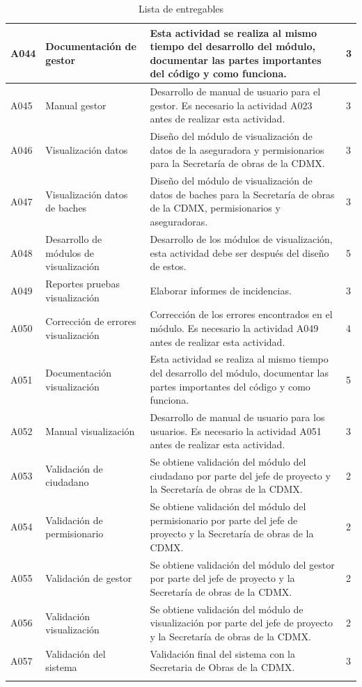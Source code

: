 \documentclass[12pt,twoside]{article}
\begin{document}
\begin{longtable}{|l|m{3cm}|m{6cm}|m{2cm}|}
    A044 & Documentación de gestor & Esta actividad se realiza al mismo tiempo del desarrollo del módulo, documentar las partes importantes del código y como funciona. & 3 \\ \hline
    A045 & Manual gestor & Desarrollo de manual de usuario para el gestor. Es necesario la actividad A023 antes de realizar esta actividad. & 3 \\ \hline
    A046 & Visualización datos & Diseño del módulo de visualización de datos de la aseguradora y permisionarios para la Secretaría de obras de la CDMX. & 3 \\ \hline
    A047 & Visualización datos de baches & Diseño del módulo de visualización de datos de baches para la Secretaría de obras de la CDMX, permisionarios y aseguradoras. & 3 \\ \hline
    A048 & Desarrollo de módulos de visualización & Desarrollo de los módulos de visualización, esta actividad debe ser después del diseño de estos. & 5 \\ \hline
    A049 & Reportes pruebas visualización & Elaborar informes de incidencias. & 3 \\ \hline
    A050 & Corrección de errores visualización & Corrección de los errores encontrados en el módulo. Es necesario la actividad A049 antes de realizar esta actividad. & 4 \\ \hline
    A051 & Documentación visualización & Esta actividad se realiza al mismo tiempo del desarrollo del módulo, documentar las partes importantes del código y como funciona. & 5 \\ \hline
    A052 & Manual visualización & Desarrollo de manual de usuario para los usuarios. Es necesario la actividad A051 antes de realizar esta actividad. & 3 \\ \hline
    A053 & Validación de ciudadano & Se obtiene validación del módulo del ciudadano por parte del jefe de proyecto y la Secretaría de obras de la CDMX. & 2 \\ \hline
    A054 & Validación de permisionario & Se obtiene validación del módulo del permisionario por parte del jefe de proyecto y la Secretaría de obras de la CDMX. & 2 \\ \hline
    A055 & Validación de gestor & Se obtiene validación del módulo del gestor por parte del jefe de proyecto y la Secretaría de obras de la CDMX. & 2 \\ \hline
    A056 & Validación visualización & Se obtiene validación del módulo de visualización por parte del jefe de proyecto y la Secretaría de obras de la CDMX. & 2 \\ \hline
    A057 & Validación del sistema & Validación final del sistema con la Secretaria de Obras de la CDMX. & 3 \\ \hline
    \caption{Lista de entregables}
    \label{table:TabAct}    
\end{longtable}
\end{document}

